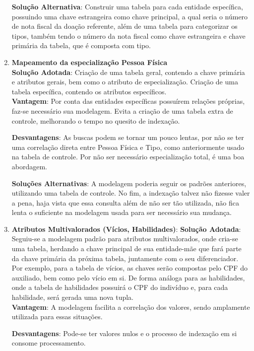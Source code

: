 \begin{enumerate}
    \textbf{Solução Alternativa}: Construir uma tabela para cada entidade específica, possuindo uma chave estrangeira como chave principal, a qual seria o número de nota fiscal da doação referente, além de uma tabela para categorizar os tipos, também tendo o número da nota fiscal como chave estrangeira e chave primária da tabela, que é composta com tipo.

    \item \textbf{Mapeamento da especialização Pessoa Física}
    \\
    \textbf{Solução Adotada}: Criação de uma tabela geral, contendo a chave primária e atributos gerais, bem como o atributo de especialização. Criação de uma tabela específica, contendo os atributos específicos. 
    \\
    \textbf{Vantagem}: Por conta das entidades específicas possuírem relações próprias, faz-se necessário sua modelagem. Evita a criação de uma tabela extra de controle, melhorando o tempo no quesito de indexação.

    \textbf{Desvantagens}: As buscas podem se tornar um pouco lentas, por não se ter uma correlação direta entre Pessoa Física e Tipo, como anteriormente usado na tabela de controle. Por não ser necessário especialização total, é uma boa abordagem.

    \textbf{Soluções Alternativas}: A modelagem poderia seguir os padrões anteriores, utilizando uma tabela de controle. No fim, a indexação talvez não fizesse valer a pena, haja vista que essa consulta além de não ser tão utilizada, não fica lenta o suficiente na modelagem usada para ser necessário sua mudança.
    
    \item \textbf{Atributos Multivalorados (Vícios, Habilidades)}:
    \textbf{Solução Adotada}: Seguiu-se a modelagem padrão para atributos multivalorados, onde cria-se uma tabela, herdando a chave principal de sua entidade-mãe que fará parte da chave primária da próxima tabela, juntamente com o seu diferenciador. Por exemplo, para a tabela de vícios, as chaves serão compostas pelo CPF do auxiliado, bem como pelo vício em si. De forma análoga para as habilidades, onde a tabela de habilidades possuirá o CPF do indivíduo e, para cada habilidade, será gerada uma nova tupla.
    \\
    \textbf{Vantagem}: A modelagem facilita a correlação dos valores, sendo amplamente utilizada para essas situações.

    \textbf{Desvantagens}: Pode-se ter valores nulos e o processo de indexação em si consome processamento.


\end{enumerate}
